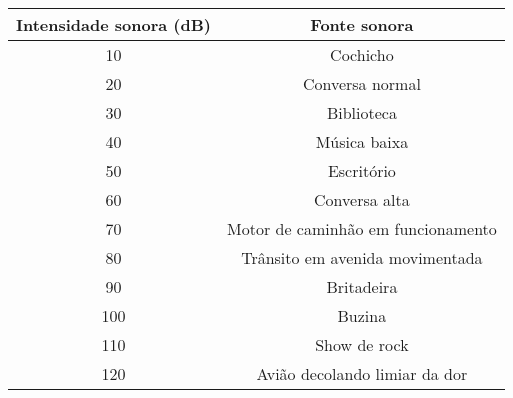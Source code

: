 \begin{table}[hb] 
\begin{tabular}{|c|c|} 
\hline Intensidade sonora (dB) & Fonte sonora\\ 
\hline 
 10 & Cochicho\\ 
\hline 
 20 & Conversa normal\\ 
\hline 
 30 & Biblioteca\\  
\hline 
 40 & Música baixa\\ 
\hline 
 50 & Escritório\\ 
\hline 
 60 & Conversa alta\\ 
\hline 
 70 & Motor de caminhão em funcionamento\\ 
\hline 
 80 & Trânsito em avenida movimentada\\ 
\hline 
 90 & Britadeira\\ 
\hline 
 100 & Buzina\\ 
\hline 
 110 & Show de rock\\ 
\hline 
 120 & Avião decolando limiar da dor\\ \hline 
\end{tabular}
\end{table}
